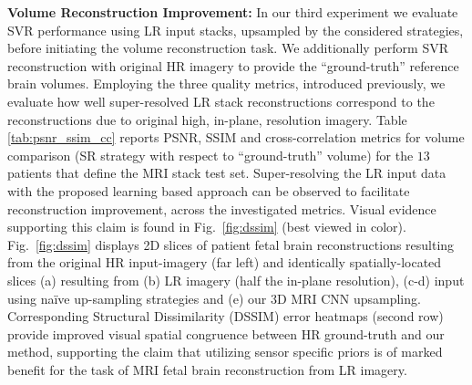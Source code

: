 \documentclass[runningheads,a4paper]{llncs}
\newcommand{\todo}[1]{}
\renewcommand{\todo}[1]{{\color{red} TODO: {#1}}}
\begin{document}
\noindent \textbf{Volume Reconstruction Improvement:} 
In our third experiment we evaluate SVR performance using LR input stacks, upsampled by the considered strategies, before initiating the volume reconstruction task. We additionally perform SVR reconstruction with original HR imagery to provide the ``ground-truth'' reference brain volumes. Employing the three quality metrics, introduced previously, we evaluate how well super-resolved LR stack reconstructions correspond to the reconstructions due to original high, in-plane, resolution imagery. Table \ref{tab:psnr_ssim_cc} reports PSNR, SSIM and cross-correlation metrics for volume comparison (SR strategy with respect to ``ground-truth'' volume) for the $13$ patients that define the MRI stack test set. Super-resolving the LR input data with the proposed learning based approach can be observed to facilitate reconstruction improvement, across the investigated metrics. Visual evidence supporting this claim is found in Fig.~\ref{fig:dssim} (best viewed in color). Fig.~\ref{fig:dssim} displays 2D slices of patient fetal brain reconstructions resulting from the original HR input-imagery (far left) and identically spatially-located slices (a) resulting from (b) LR imagery (half the in-plane resolution), (c-d) input using na\"ive up-sampling strategies and (e) our 3D MRI CNN upsampling. Corresponding Structural Dissimilarity (DSSIM) error heatmaps (second row) provide improved visual spatial congruence between HR ground-truth and our method, supporting the claim that utilizing sensor specific priors is of marked benefit for the task of MRI fetal brain reconstruction from LR imagery.
\end{document}
